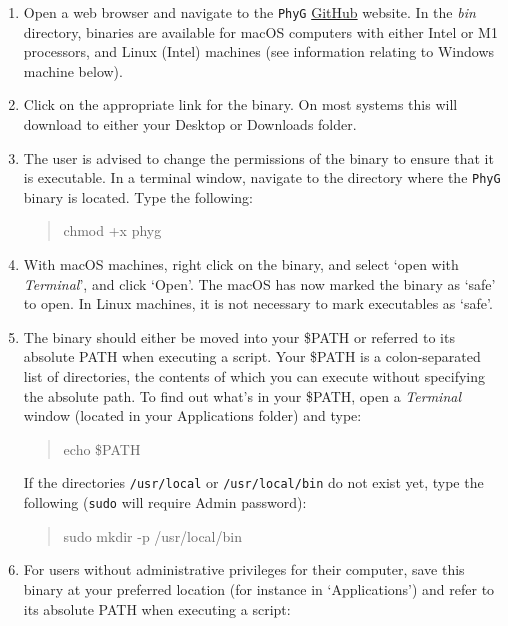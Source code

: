 \documentclass[]{article}
\newcommand{\phyg}{\texttt{PhyG} }
\begin{document}
\begin{enumerate}
\item Open a web browser and navigate to the \phyg \href{https://github.com/amnh/PhyGraph}
{GitHub} website. In the \textit{bin} directory, binaries are available for macOS 
computers with either Intel or M1 processors, and Linux (Intel) machines (see information 
relating to Windows machine below).

\item Click on the appropriate link for the binary. On most systems this will 
download to either your Desktop or Downloads folder. 

\item The user is advised to change the permissions of the binary to ensure
that it is executable. In a terminal window, navigate to the directory where the \phyg
binary is located. Type the following:

	\begin{quote}
	chmod +x phyg
	\end{quote}

\item With macOS machines, right click on the binary, and select `open with 
\textit{Terminal}', and click `Open'. The macOS has now marked the binary as `safe' 
to open. In Linux machines, it is not necessary to mark executables as `safe'.

\item The binary should either be moved into your \$PATH or referred to its 
absolute PATH when executing a script. Your \$PATH is a colon-separated list 
of directories, the contents of which you can execute without specifying the 
absolute path. To find out what's in your \$PATH, open a \textit{Terminal} window 
(located in your Applications folder) and type: 

	\begin{quote}
	echo \$PATH
	\end{quote}

If the directories \texttt{/usr/local} or \texttt{/usr/local/bin} do not exist yet, type the 
following (\texttt{sudo} will require Admin password): 

	\begin{quote}
	sudo mkdir -p /usr/local/bin
	\end{quote}

\item For users without administrative privileges for their computer, save
this binary at your preferred location (for instance in `Applications') and refer to its 
absolute PATH when executing a script: 


\end{enumerate}
\end{document}
